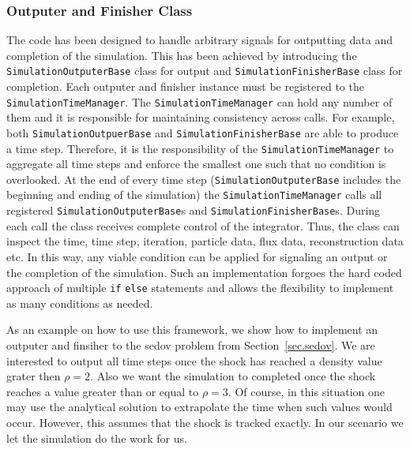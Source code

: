 \subsubsection{Outputer and Finisher Class}
\label{sec.outputters}
The code has been designed to handle arbitrary signals for outputting data
and completion of the simulation. This has been achieved by introducing the
\lstinline{SimulationOutputerBase} class for output and
\lstinline{SimulationFinisherBase} class for completion. Each outputer and finisher instance
must be registered to the \lstinline{SimulationTimeManager}. The \lstinline{SimulationTimeManager}
can hold any number of them and it is responsible for maintaining consistency 
across calls. For example, both \lstinline{SimulationOutpuerBase} and 
\lstinline{SimulationFinisherBase} are able to produce a time step. Therefore, it is
the responsibility of the \lstinline{SimulationTimeManager} to aggregate all time steps
and enforce the smallest one such that no condition is overlooked. At the end of every
time step (\lstinline{SimulationOutputerBase} includes the beginning and ending
of the simulation) the \lstinline{SimulationTimeManager} calls all registered
\lstinline{SimulationOutputerBase}s and \lstinline{SimulationFinisherBase}s.
During each call the class receives complete control of the integrator. Thus,
the class can inspect the time, time step, iteration, particle data, flux data,
reconstruction data etc. In this way, any viable condition can be applied
for signaling an output or the completion of the simulation. Such an implementation
forgoes the hard coded approach of multiple \texttt{if} \texttt{else} statements
and allows the flexibility to implement as many conditions as needed.

As an example on how to use this framework, we show how to implement an outputer and finsiher
to the sedov problem from Section~\ref{sec.sedov}. We are interested to output all time steps once
the shock has reached a density value grater then $\rho=2$. Also we want the simulation to completed once the shock
reaches a value greater than or equal to $\rho=3$. Of course, in this
situation one may use the analytical solution to extrapolate the time when such values would occur.
However, this assumes that the shock is tracked exactly. In our scenario we let the simulation do the work
for us.

